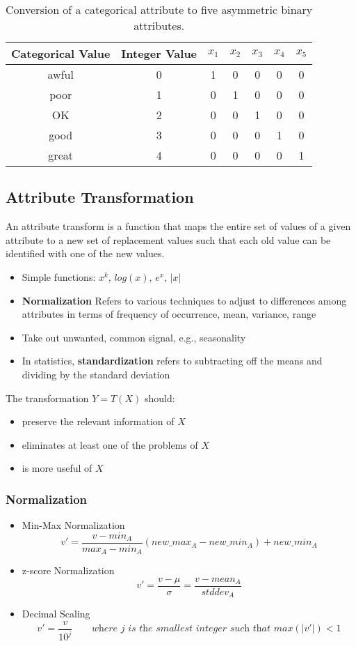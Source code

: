 \begin{table}[htbp]
\centering
\caption{Conversion of a categorical attribute to five asymmetric binary attributes.}
\begin{tabular}{|c|c|c|c|c|c|c|}
\hline
\textbf{Categorical Value} & \textbf{Integer Value} & \textbf{$x_1$} & \textbf{$x_2$} & \textbf{$x_3$} & \textbf{$x_4$} & \textbf{$x_5$} \\
\hline
awful & 0 & 1 & 0 & 0 & 0 & 0 \\
\hline
poor & 1 & 0 & 1 & 0 & 0 & 0 \\
\hline
OK & 2 & 0 & 0 & 1 & 0 & 0 \\
\hline
good & 3 & 0 & 0 & 0 & 1 & 0 \\
\hline
great & 4 & 0 & 0 & 0 & 0 & 1 \\
\hline
\end{tabular}
\label{tab:binary_five}
\end{table}

\subsection{Attribute Transformation}
An attribute transform is a function that maps the
entire set of values of a given attribute to a new set
of replacement values such that each old value can be
identified with one of the new values.
\begin{itemize}
	\item Simple functions: $x^k$, $log(x)$, $e^x$, $|x|$
	\item \textbf{Normalization} Refers to various techniques to adjust to differences among attributes in terms of frequency of occurrence, mean, variance, range
	\item Take out unwanted, common signal, e.g., seasonality
	\item In statistics, \textbf{standardization} refers to subtracting off the means and dividing by the standard deviation
\end{itemize}

{The transformation $Y = T(X)$ should:\ns
\begin{itemize}
	\item preserve the relevant information of $X$
	\item eliminates at least one of the problems of $X$
	\item is more useful of $X$
\end{itemize}}

\subsubsection{Normalization}
\begin{itemize}
   \item Min-Max Normalization
   \[
   v' = \frac{v - min_A}{max_A - min_A} (new\_max_A - new\_min_A) + new\_min_A
   \]
   \item z-score Normalization
   \[
      v' = \frac{v - \mu}{\sigma} = \frac{v - mean_A}{stddev_A}
   \] 
   \item Decimal Scaling
   \[
      v' = \frac{v}{10^j} \qquad \textit{where } j \textit{ is the smallest integer such that } max(|v'|) < 1
   \]
\end{itemize}

